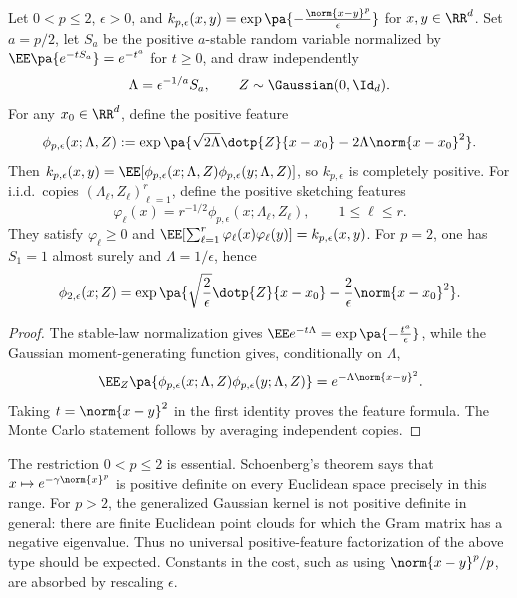 \begin{prop}
\label{prop-gaussian-positive-features}
Let \(0<p\leq2\), \(\epsilon>0\), and
	$k_{p,\epsilon}(x,y) = \exp\pa{-\frac{\norm{x-y}^p}{\epsilon}}$ for $x,y\in\RR^d$.
Set \(a=p/2\), let \(S_a\) be the positive \(a\)-stable random variable normalized by
$\EE\pa{e^{-tS_a}}=e^{-t^a}$ for $t\geq0$,
and draw independently
\[
	\Lambda=\epsilon^{-1/a}S_a,
	\qquad
	Z\sim\Gaussian(0,\Id_d).
\]
For any \(x_0\in\RR^d\), define the positive feature
\[
	\phi_{p,\epsilon}(x;\Lambda,Z)
	:=
	\exp\pa{
		\sqrt{2\Lambda}\dotp{Z}{x-x_0}
		-2\Lambda\norm{x-x_0}^2
	}.
\]
Then \(k_{p,\epsilon}(x,y)=\EE[\phi_{p,\epsilon}(x;\Lambda,Z)\phi_{p,\epsilon}(y;\Lambda,Z)]\), so \(k_{p,\epsilon}\) is completely positive. For i.i.d.\ copies \((\Lambda_\ell,Z_\ell)_{\ell=1}^r\), define the positive sketching features
\[
	\varphi_\ell(x)=r^{-1/2}\phi_{p,\epsilon}(x;\Lambda_\ell,Z_\ell),
	\qquad 1\leq\ell\leq r.
\]
They satisfy \(\varphi_\ell\geq0\) and \(\EE[\sum_{\ell=1}^r\varphi_\ell(x)\varphi_\ell(y)]=k_{p,\epsilon}(x,y)\). For \(p=2\), one has \(S_1=1\) almost surely and \(\Lambda=1/\epsilon\), hence
\[
	\phi_{2,\epsilon}(x;Z)
	=
	\exp\pa{
		\sqrt{\frac{2}{\epsilon}}\dotp{Z}{x-x_0}
		-\frac{2}{\epsilon}\norm{x-x_0}^2
	}.
\]
\end{prop}

\begin{proof}
The stable-law normalization gives
$\EE e^{-t\Lambda} = \exp\pa{-\frac{t^a}{\epsilon}}$,
while the Gaussian moment-generating function gives, conditionally on \(\Lambda\),
\[
	\EE_Z\pa{
		\phi_{p,\epsilon}(x;\Lambda,Z)
		\phi_{p,\epsilon}(y;\Lambda,Z)
	}
	=
	e^{-\Lambda\norm{x-y}^2}.
\]
Taking \(t=\norm{x-y}^2\) in the first identity proves the feature formula. The Monte Carlo statement follows by averaging independent copies.
\end{proof}

\begin{rem}
The restriction \(0<p\leq2\) is essential. Schoenberg's theorem says that \(x\mapsto e^{-\gamma\norm{x}^p}\) is positive definite on every Euclidean space precisely in this range. For \(p>2\), the generalized Gaussian kernel is not positive definite in general: there are finite Euclidean point clouds for which the Gram matrix has a negative eigenvalue. Thus no universal positive-feature factorization of the above type should be expected. Constants in the cost, such as using \(\norm{x-y}^p/p\), are absorbed by rescaling \(\epsilon\).
\end{rem}



